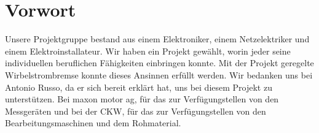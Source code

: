 \section{Vorwort}
Unsere Projektgruppe bestand aus einem Elektroniker, einem Netzelektriker und einem Elektroinstallateur. Wir haben ein Projekt gewählt, worin jeder seine individuellen beruflichen Fähigkeiten einbringen konnte. Mit der Projekt geregelte Wirbelstrombremse konnte dieses Ansinnen erfüllt werden.
\newpara
Wir bedanken uns bei Antonio Russo, da er sich bereit erklärt hat, uns bei diesem Projekt
zu unterstützen. Bei maxon motor ag, für das zur Verfügungstellen von den Messgeräten und bei
der CKW, für das zur Verfügungstellen von den Bearbeitungsmaschinen und dem Rohmaterial.